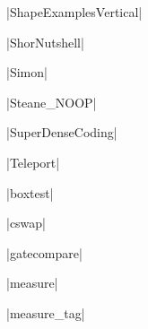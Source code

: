 \documentclass{article}
\begin{document}
|ShapeExamplesVertical|
\begin{figure}[ht]
\caption{\protect{}}

\end{figure}

|ShorNutshell|
\begin{figure}[ht]
\caption{\protect{}}

\end{figure}

|Simon|
\begin{figure}[ht]
\caption{\protect{}}

\end{figure}

|Steane_NOOP|
\begin{figure}[ht]
\caption{\protect{}}

\end{figure}

|SuperDenseCoding|
\begin{figure}[ht]
\caption{\protect{}}

\end{figure}
\clearpage

|Teleport|
\begin{figure}[ht]
\caption{\protect{}}

\end{figure}

|boxtest|
\begin{figure}[ht]
\caption{\protect{}}

\end{figure}

|cswap|
\begin{figure}[ht]
\caption{\protect{}}

\end{figure}

|gatecompare|
\begin{figure}[ht]
\caption{\protect{}}

\end{figure}

|measure|
\begin{figure}[ht]
\caption{\protect{}}

\end{figure}

|measure_tag|
\begin{figure}[ht]
\caption{\protect{}}

\end{figure}
\end{document}

